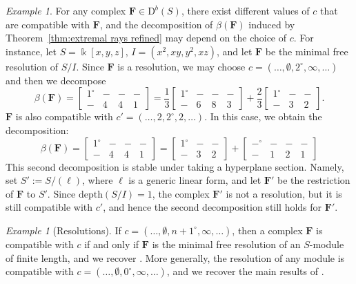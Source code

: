 \documentclass[12pt]{amsart}
\theoremstyle{definition}
\theoremstyle{remark}
\newtheorem{example}[lemma]{Example}
\newcommand{\kk}{\Bbbk}
\newcommand{\cc}{c}
\newcommand{\FF}{\mathbf{F}}
\newcommand{\zp}{\circ}
\newcommand{\nothing}{\emptyset}
\newcommand{\DD}{\mathrm{D}}
\begin{document}
\begin{example}\label{example:many decompositions}
For any complex $\FF\in \DD^b(S)$, there exist different values of $\cc$ that are compatible with $\FF$, and the decomposition of $\beta(\FF)$ induced by Theorem~\ref{thm:extremal rays refined} may depend on the choice of $\cc$.   For instance, let $S=\kk[x,y,z]$, $I=(x^2,xy,y^2,xz)$, and let $\FF$ be the minimal free resolution of $S/I$.  Since $\FF$ is a resolution, we may choose $\cc=(\dots, \nothing, 2^\zp, \infty, \dots)$ and then we decompose
\[
\beta(\FF)=\begin{bmatrix}
1^\zp&-&-&-\\
-&4&4&1
\end{bmatrix}
=
\frac{1}{3}
\begin{bmatrix}
1^\zp&-&-&-\\
-&6&8&3
\end{bmatrix}
+\frac{2}{3}
\begin{bmatrix}
1^\zp&-&-\\
-&3&2
\end{bmatrix}.
\]
$\FF$ is also compatible with $\cc'=(\dots, 2, 2^\zp, 2, \dots)$.  In this case, we obtain the decomposition:
\[
\beta(\FF)=
\begin{bmatrix}
1^\zp&-&-&-\\
-&4&4&1
\end{bmatrix}
=\begin{bmatrix}1^\zp&-&-\\-&3&2\end{bmatrix}
+
\begin{bmatrix}
-^\zp&-&-&-\\
-&1&2&1
\end{bmatrix}
\] 
This second decomposition is stable under taking a hyperplane section.  Namely, set $S':=S/(\ell)$, where $\ell$ is a generic linear form, and let $\FF'$ be the restriction of $\FF$ to $S'$.  Since $\text{depth}(S/I)=1$, the complex $\FF'$ is not a resolution, but it is still compatible with $\cc'$, and hence the second decomposition still holds for $\FF'$.
\end{example}

\begin{example}[Resolutions]\label{ex:resolutions}
 If  $\cc=(\dots, \nothing, n+1^\zp, \infty, \dots)$, then a complex $\FF$ is compatible with $\cc$ if and only if $\FF$ is the minimal free resolution of an $S$-module of finite length, and we recover \cite[Theorem~0.2]{eis-schrey1}. More generally, the resolution of any module is compatible with
$\cc=(\dots, \nothing, 0^\zp, \infty, \dots)$, and we recover the main results of \cite{boij-sod2}. 
\end{example}
\end{document}
